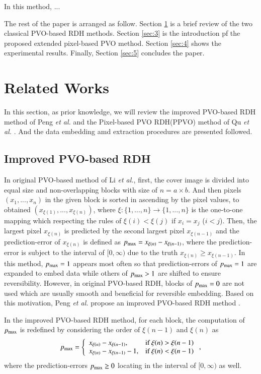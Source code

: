\documentclass[review,3p,10pt,sort&compress]{elsarticle}
\begin{document}
In this method, ...

The rest of the paper is arranged as follow. Section \ref{sec:2} is a brief review of the two classical PVO-based RDH methods. Section \ref{sec:3} is the introduction pf the proposed extended pixel-based PVO method. Section \ref{sec:4} shows the experimental results. Finally, Section \ref{sec:5} concludes the paper.

\section{Related Works}\label{sec:2}
In this section, as prior knowledge, we will review the improved PVO-based RDH method of Peng \emph{et al.} \cite{Peng2014IPVO} and the Pixel-based PVO RDH(PPVO) method of Qu \emph{et al.} \cite{Qu2015PPVO}. And the data embedding amd extraction procedures are presented followed. 

\subsection{Improved PVO-based RDH \cite{Peng2014IPVO}}\label{sec:2.1}
In original PVO-based method \cite{Li2013PVO} of Li \emph{et al.}, first, the cover image is divided into equal size and non-overlapping blocks with size of $n = a \times b$. And then pixels $(x_{1},...,x_{n})$ in the given block is sorted in ascending by the pixel values, to obtained $(x_{\xi(1)},...,x_{\xi(n)})$, where $\xi : \{1,...,n\} \rightarrow \{1,...,n\}$ is the one-to-one mapping which respecting the rules of $\xi(i) < \xi(j)$ if $x_{i} = x_{j}$ ($i < j$). Then, the largest pixel $x_{\xi(n)}$ is predicted by the second largest pixel $x_{\xi(n-1)}$ and the prediction-error of $x_{\xi(n)}$ is defined as $p_{\rm max} = x_{\xi(n)} - x_{\xi(n-1)}$, where the prediction-error is subject to the interval of $[0, \infty)$ due to the truth $x_{\xi(n)} \geq x_{\xi(n-1)}$. In this method, $p_{\rm max} = 1$ appears  most often so that prediction-errors of $p_{\rm max} = 1$ are expanded to embed data while others of $p_{\rm max} > 1$
are shifted to ensure reversibility. However, in original PVO-based RDH, blocks of $p_{\rm max} = 0$ are not used which are usually smooth and beneficial for reversible embedding. Based on this motivation, Peng \emph{et al.} propose an improved PVO-based RDH method \cite{Peng2014IPVO}.

In the improved PVO-based RDH method, for each block, the computation of $p_{\rm max}$ is redefined by considering the order of $\xi(n-1)$ and $\xi(n)$ as
\begin{equation}\label{eq:pmax}
p_{\rm max} = \left\{\begin{array}{ll}
x_{\xi(n)} - x_{\xi(n-1)},      & \text{if } \xi(n) > \xi(n-1) \\
x_{\xi(n)} - x_{\xi(n-1)} - 1,  & \text{if } \xi(n) < \xi(n-1)
\end{array}\right.,
\end{equation}
where the prediction-errors $p_{\rm max} \geq 0$ locating in the interval of $[0, \infty)$ as well.
\end{document}
